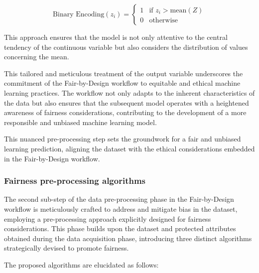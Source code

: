 \begin{itemize}
    \[
    \text{Binary Encoding}(z_i) = \begin{cases} 
    1 & \text{if } z_i > \text{mean}(Z) \\ 
    0 & \text{otherwise}
    \end{cases}
    \]

    This approach ensures that the model is not only attentive to the central tendency of the continuous variable but also considers the distribution of values concerning the mean.

    This tailored and meticulous treatment of the output variable underscores the commitment of the Fair-by-Design workflow to equitable and ethical machine learning practices. The workflow not only adapts to the inherent characteristics of the data but also ensures that the subsequent model operates with a heightened awareness of fairness considerations, contributing to the development of a more responsible and unbiased machine learning model.

\end{itemize}

This nuanced pre-processing step sets the groundwork for a fair and unbiased learning prediction, aligning the dataset with the ethical considerations embedded in the Fair-by-Design workflow.

\subsubsection{Fairness pre-processing algorithms}

The second sub-step of the data pre-processing phase in the Fair-by-Design workflow is meticulously crafted to address and mitigate bias in the dataset, employing a pre-processing approach explicitly designed for fairness considerations. This phase builds upon the dataset and protected attributes obtained during the data acquisition phase, introducing three distinct algorithms strategically devised to promote fairness.

The proposed algorithms are elucidated as follows:

